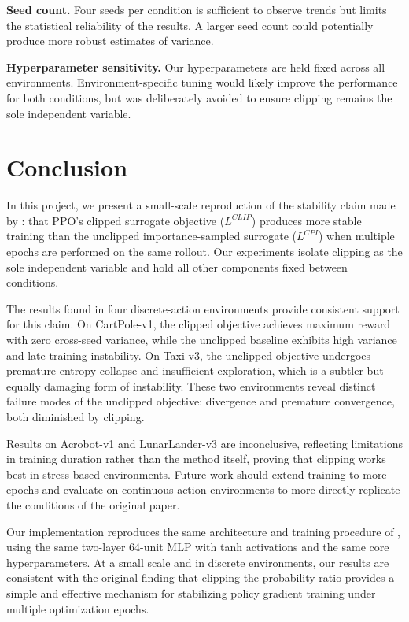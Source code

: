 \documentclass{article}
\begin{document}
\textbf{Seed count.} Four seeds per condition is sufficient to observe trends but limits the statistical reliability of the results. A larger seed count could potentially produce more robust estimates of variance.

\textbf{Hyperparameter sensitivity.} Our hyperparameters are held fixed across all environments. Environment-specific tuning would likely improve the performance for both conditions, but was deliberately avoided to ensure clipping remains the sole independent variable.


\section{Conclusion}

In this project, we present a small-scale reproduction of the stability claim made by \citep{schulman2017ppo}: that PPO's clipped surrogate objective ($L^{CLIP}$) produces more stable training than the unclipped importance-sampled surrogate ($L^{CPI}$) when multiple epochs are performed on the same rollout. Our experiments isolate clipping as the sole independent variable and hold all other components fixed between conditions.

The results found in four discrete-action environments provide consistent support for this claim. On CartPole-v1, the clipped objective achieves maximum reward with zero cross-seed variance, while the unclipped baseline exhibits high variance and late-training instability. On Taxi-v3, the unclipped objective undergoes premature entropy collapse and insufficient exploration, which is a subtler but equally damaging form of instability. These two environments reveal distinct failure modes of the unclipped objective: divergence and premature convergence, both diminished by clipping.

Results on Acrobot-v1 and LunarLander-v3 are inconclusive, reflecting limitations in training duration rather than the method itself, proving that clipping works best in stress-based environments. Future work should extend training to more epochs and evaluate on continuous-action environments to more directly replicate the conditions of the original paper.

Our implementation reproduces the same architecture and training procedure of \citep{schulman2017ppo}, using the same two-layer 64-unit MLP with tanh activations and the same core hyperparameters. At a small scale and in discrete environments, our results are consistent with the original finding that clipping the probability ratio provides a simple and effective mechanism for stabilizing policy gradient training under multiple optimization epochs.
\end{document}
